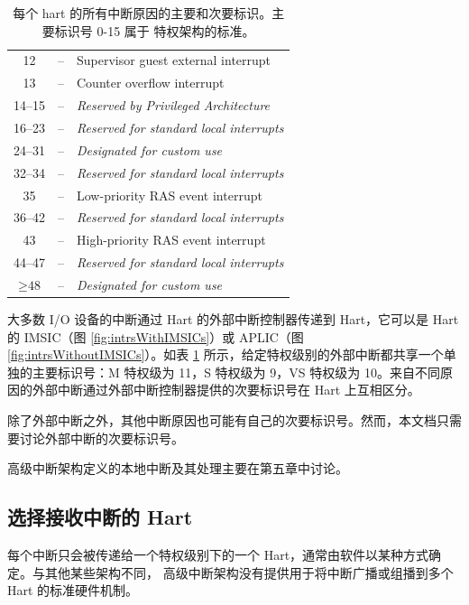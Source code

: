 \begin{translation}
\begin{table}[h!]
\begin{center}
\begin{tabular}{|c|c|l|}
    \hline
    12                   & -- & Supervisor guest external interrupt \\
    13                   & -- & Counter overflow interrupt \\
    14--15               & -- & \em Reserved by Privileged Architecture \\
    \hline
    \hline
    16--23         & --       & \em Reserved for standard local interrupts \\
    \hline
    24--31         & --       & \em Designated for custom use \\
    \hline
    32--34         & --       & \em Reserved for standard local interrupts \\
    35             & --       & Low-priority RAS event interrupt \\
    36--42         & --       & \em Reserved for standard local interrupts \\
    43             & --       & High-priority RAS event interrupt \\
    44--47         & --       & \em Reserved for standard local interrupts \\
    \hline
    $\geq \mbox{48}$ & --     & \em Designated for custom use \\
    \hline
    \end{tabular}
    \end{center}
    \caption{每个 hart 的所有中断原因的主要和次要标识。主要标识号 0-15 属于 {\RISCV} 特权架构的标准。}
    \label{tab:interruptIdents}
\end{table}

大多数 I/O 设备的中断通过 Hart 的外部中断控制器传递到 Hart，它可以是 Hart 的 IMSIC（图 \ref{fig:intrsWithIMSICs}）或 APLIC（图 \ref{fig:intrsWithoutIMSICs}）。如表 \ref{tab:interruptIdents} 所示，给定特权级别的外部中断都共享一个单独的主要标识号：M 特权级为 11，S 特权级为 9，VS 特权级为 10。来自不同原因的外部中断通过外部中断控制器提供的次要标识号在 Hart 上互相区分。

除了外部中断之外，其他中断原因也可能有自己的次要标识号。然而，本文档只需要讨论外部中断的次要标识号。

高级中断架构定义的本地中断及其处理主要在第五章中讨论。

\subsection{选择接收中断的 Hart}

每个中断只会被传递给一个特权级别下的一个 Hart，通常由软件以某种方式确定。与其他某些架构不同，{\RISCV} 高级中断架构没有提供用于将中断广播或组播到多个 Hart 的标准硬件机制。


\end{translation}
